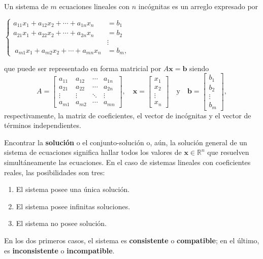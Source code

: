 \begin{definition}
Un sistema de $m$ ecuaciones lineales con $n$ incógnitas es un arreglo expresado por

$\begin{cases}
a_{11}x_1 + a_{12}x_2 + \cdots + a_{1n}x_n &= b_1  \\
a_{21}x_1 + a_{22}x_2 + \cdots + a_{2n}x_n &= b_2  \\
&\vdots \\\
a_{m1}x_1 + a_{m2}x_2 + \cdots + a_{mn}x_n &= b_m,
\end{cases}$

que puede ser representado en forma matricial por $A\mathbf{x} = \mathbf{b}$
siendo
\begin{equation*}
A = \begin{bmatrix}
a_{11} & a_{12} & \cdots & a_{1n} \\
a_{21} & a_{22} & \cdots & a_{2n} \\
\vdots & \vdots & \ddots & \vdots \\
a_{m1} & a_{m2} & \cdots & a_{mn}
\end{bmatrix}, \quad
\mathbf{x} = \begin{bmatrix}
x_1 \\ x_2 \\ \vdots \\ x_n
\end{bmatrix} \quad \text{y} \quad
\mathbf{b} = \begin{bmatrix}
b_1 \\ b_2 \\ \vdots \\ b_m
\end{bmatrix},
\end{equation*}
respectivamente, la matriz de coeficientes, el vector de incógnitas y el vector de términos independientes.
\end{definition}

\begin{definition}
Encontrar la \textbf{solución} o el conjunto-solución o, aún, la solución general de un sistema de ecuaciones significa hallar todos los valores de $\mathbf{x} \in \mathbb{R}^n$ que resuelven simultáneamente las ecuaciones.
En el caso de sistemas lineales con coeficientes reales, las posibilidades son tres:
\begin{enumerate}
\item El sistema posee una única solución.
\item El sistema posee infinitas soluciones.
\item El sistema no posee solución.
\end{enumerate}
En los dos primeros casos, el sistema es \textbf{consistente} o \textbf{compatible}; en el último, es \textbf{inconsistente} o \textbf{incompatible}.
\end{definition}

